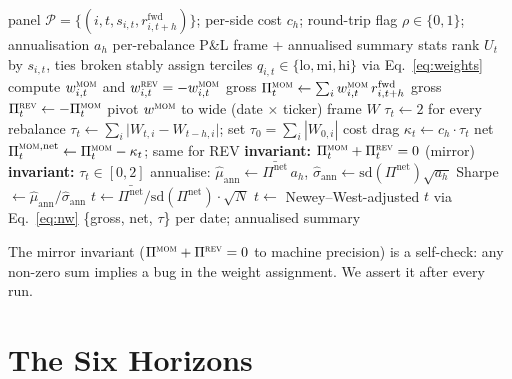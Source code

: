 \documentclass[10pt,conference,compsoc]{IEEEtran}
\newcommand{\MOM}{\textsc{mom}}  \newcommand{\REV}{\textsc{rev}}
\begin{document}
\begin{algorithm}[ht]
\small
\caption{\textsc{run\_horizon} --- unified tercile long--short}
\label{alg:engine}
\begin{algorithmic}[1]
\Require panel $\mathcal{P} = \{(i, t, s_{i,t}, r^{\text{fwd}}_{i,t+h})\}$; per-side cost $c_h$; round-trip flag $\rho \in \{0,1\}$; annualisation $a_h$
\Ensure per-rebalance P\&L frame + annualised summary stats
  \State rank $U_t$ by $s_{i,t}$, ties broken stably
  \State assign terciles $q_{i,t} \in \{\text{lo}, \text{mi}, \text{hi}\}$ via Eq.~\eqref{eq:weights}
  \State compute $w^{\MOM}_{i,t}$ and $w^{\REV}_{i,t} = -w^{\MOM}_{i,t}$
  \State gross $\Pi^{\MOM}_t \gets \sum_i w^{\MOM}_{i,t}\, r^{\text{fwd}}_{i,t+h}$
  \State gross $\Pi^{\REV}_t \gets -\Pi^{\MOM}_t$ 
\EndFor
\State pivot $w^{\MOM}$ to wide (date $\times$ ticker) frame $W$
 
  \State $\tau_t \gets 2$ for every rebalance
\Else {}
  \State $\tau_t \gets \sum_i \bigl|W_{t,i} - W_{t{-}h,i}\bigr|$; set $\tau_0 = \sum_i |W_{0,i}|$
\EndIf
\State cost drag $\kappa_t \gets c_h \cdot \tau_t$
\State net $\Pi^{\MOM,\text{net}}_t \gets \Pi^{\MOM}_t - \kappa_t$; same for REV
\State \textbf{invariant:} $\Pi^{\MOM}_t + \Pi^{\REV}_t = 0$ (mirror)
\State \textbf{invariant:} $\tau_t \in [0, 2]$
\State annualise: $\hat\mu_{\text{ann}} \gets \bar{\Pi^{\text{net}}}\,a_h$, $\hat\sigma_{\text{ann}} \gets \mathrm{sd}(\Pi^{\text{net}})\sqrt{a_h}$
\State Sharpe $\gets \hat\mu_{\text{ann}}/\hat\sigma_{\text{ann}}$
\State $t \gets \bar{\Pi^{\text{net}}} / \mathrm{sd}(\Pi^{\text{net}})\cdot \sqrt{N}$
 $t \gets $ Newey--West-adjusted $t$ via Eq.~\eqref{eq:nw}
\EndIf
\State \Return \{gross, net, $\tau$\} per date; annualised summary
\end{algorithmic}
\end{algorithm}

The mirror invariant ($\Pi^{\MOM} + \Pi^{\REV} = 0$ to machine precision)
is a self-check: any non-zero sum implies a bug in the weight assignment.
We assert it after every run.

\section{The Six Horizons}
\label{sec:six}
\end{document}
